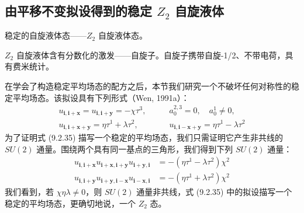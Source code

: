 \subsection{由平移不变拟设得到的稳定 $Z_2$ 自旋液体}

\begin{keypoints}
\item 稳定的自旋液体态——$Z_2$ 自旋液体态。
\item $Z_2$ 自旋液体含有分数化的激发——自旋子。自旋子携带自旋-1/2、不带电荷，具有费米统计。
\end{keypoints}

在学会了构造稳定平均场态的配方之后，本节我们研究一个不破坏任何对称性的稳定平均场态。该拟设具有下列形式（Wen, 1991a）：
\begin{align*}
u_{\pmb{i},\pmb{i}+\pmb{x}}=u_{\pmb{i},\pmb{i}+\pmb{y}}=-\chi\tau^{3},\qquad & a_0^{2,3}=0,\quad a_0^{1}\neq 0,\\
u_{\pmb{i},\pmb{i}+\pmb{x}+\pmb{y}}=\eta\tau^{1}+\lambda\tau^{2},\qquad & u_{\pmb{i},\pmb{i}-\pmb{x}+\pmb{y}}=\eta\tau^{1}-\lambda\tau^{2}
\tag{9.2.35}
\end{align*}
为了证明式 (9.2.35) 描写一个稳定的平均场态，我们只需证明它产生非共线的 $SU(2)$ 通量。围绕两个具有同一基点的三角形，我们得到下列 $SU(2)$ 通量：
\begin{align*}
u_{\pmb{i},\pmb{i}+\pmb{x}}u_{\pmb{i}+\pmb{x},\pmb{i}+\pmb{y}}u_{\pmb{i}+\pmb{y},\pmb{i}}&=-(\eta\tau^{1}-\lambda\tau^{2})\chi^{2}\\
u_{\pmb{i},\pmb{i}+\pmb{y}}u_{\pmb{i}+\pmb{y},\pmb{i}-\pmb{x}}u_{\pmb{i}-\pmb{x},\pmb{i}}&=-(\eta\tau^{1}+\lambda\tau^{2})\chi^{2}
\end{align*}
我们看到，若 $\chi\eta\lambda\neq 0$，则 $SU(2)$ 通量非共线，式 (9.2.35) 中的拟设描写一个稳定的平均场态，更确切地说，一个 $Z_2$ 态。

